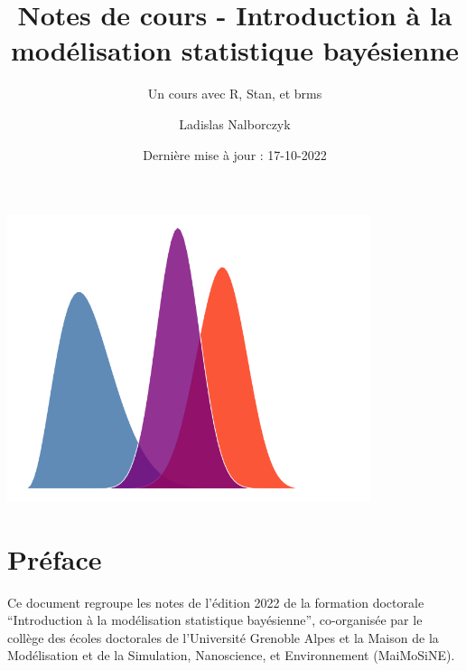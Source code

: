\documentclass[
  a4paper,11pt,twoside,onecolumn,openright,final,oldfontcommands]{memoir}
\title{Notes de cours - Introduction à la modélisation statistique bayésienne}
\subtitle{Un cours avec R, Stan, et brms}
\author{Ladislas Nalborczyk}
\date{Dernière mise à jour : 17-10-2022}
\newcommand\blankpage{%
    \null
    \thispagestyle{empty}%
    \newpage
    }
\theoremstyle{definition}
\theoremstyle{definition}
\theoremstyle{definition}
\theoremstyle{definition}
\theoremstyle{remark}
\begin{document}
\maketitle


\thispagestyle{empty}


\begin{center} %

  \includegraphics[width=0.8\textwidth]{figures/cover_distributions.png}

\end{center}

\newpage
\blankpage %

\OnehalfSpacing %


{
\hypersetup{linkcolor=}
\setcounter{tocdepth}{2}
\tableofcontents
}
\hypertarget{pruxe9face}{%
\chapter*{Préface}\label{pruxe9face}}


Ce document regroupe les notes de l'édition 2022 de la formation doctorale ``Introduction à la modélisation statistique bayésienne'', co-organisée par le collège des écoles doctorales de l'Université Grenoble Alpes et la Maison de la Modélisation et de la Simulation, Nanoscience, et Environnement (MaiMoSiNE).
\end{document}
